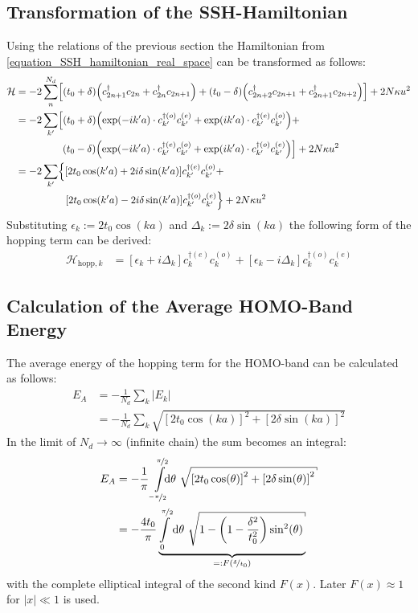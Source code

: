 \subsection{Transformation of the SSH-Hamiltonian}
Using the relations of the previous section the Hamiltonian from \cref{equation_SSH_hamiltonian_real_space} can be transformed as follows:
\begin{align}
\mathcal{H} &= -2\sum_n^{N_d} \left[\left(t_0+\delta\right)\left(c_{2n+1}^\dagger c_{2n} + c_{2n}^\dagger c_{2n+1} \right) + 
\left(t_0-\delta\right)\left(c_{2n+2}^\dagger c_{2n+1} + c_{2n+1}^\dagger c_{2n+2}\right)\right]+2N\kappa u^2\\
&= -2\sum_{k'} \left[\left(t_0+\delta\right)\left(\exp\left(-ik'a\right) \cdot c_{k'}^{\dagger(o)}c_{k'}^{(e)} + \exp\left(ik'a\right)\cdot c_{k'}^{\dagger(e)}c_{k'}^{(o)}\right)+ \right.\nonumber\\
&\hspace*{1.6cm}\left.\left(t_0-\delta\right)\left(\exp\left(-ik'a\right)\cdot  c_{k'}^{\dagger(e)}c_{k'}^{(o)}+\exp\left(ik'a\right)\cdot  c_{k'}^{\dagger(o)}c_{k'}^{(e)}\right)\right]+2N\kappa u^2\\
&= -2\sum_{k'} \left\{\left[2t_0\cos(k'a) + 2i\delta\sin(k'a)\right]c_{k'}^{\dagger(e)}c_{k'}^{(o)} + \right.\nonumber\\
&\hspace*{1.7cm}\left. \left[2t_0\cos(k'a)-2i\delta\sin(k'a)\right] c_{k'}^{\dagger(o)}c_{k'}^{(e)}\right\}+2N\kappa u^2
\end{align}
Substituting $\epsilon_k := 2t_0\cos(ka)$ and $\Delta_k := 2\delta\sin(ka)$ the following form of the hopping term can be derived:
\begin{align}
\mathcal{H}_{\text{hopp},k} &=
\left[\epsilon_k + i\Delta_k\right]c_{k}^{\dagger(e)}c_{k}^{(o)} + \left[\epsilon_k-i\Delta_k \right]	c_{k}^{\dagger(o)}c_{k}^{(e)}
\end{align}
\subsection{Calculation of the Average HOMO-Band Energy}
The average energy of the hopping term for the HOMO-band can be calculated as follows:
\begin{align}
E_A &=-\frac{1}{N_d}\sum_k |E_k|\\
&= -\frac{1}{N_d}\sum_k \sqrt{\left[2t_0\cos(ka)\right]^2+\left[2\delta\sin(ka)\right]^2}
\end{align}
In the limit of $N_d \rightarrow \infty$ (infinite chain) the sum becomes an integral:
\begin{align}
E_A &= -\frac{1}{\pi}\int\limits_{\nicefrac{-\pi}{2}}^{\nicefrac{\pi}{2}}\hspace*{-0.2cm}\text{d}\theta\ \sqrt{\left[2t_0\cos(\theta)\right]^2+\left[2\delta\sin(\theta)\right]^2}\\
&=-\frac{4t_0}{\pi}\underbrace{\int\limits_{0}^{\nicefrac{\pi}{2}}\text{d}\theta\ \sqrt{1-\left(1-\frac{\delta^2}{t_0^2}\right)\sin^2(\theta)}}_{=:F(\nicefrac{\delta}{t_0})}
\end{align}
with the complete elliptical integral of the second kind $F(x)$. Later $F(x) \approx 1$ for $|x|\ll 1$ is used.

